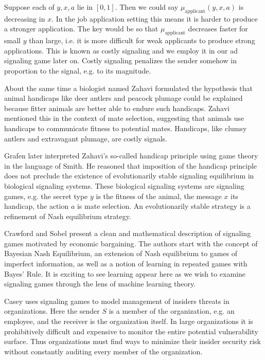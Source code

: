 \documentclass{article}
\begin{document}
Suppose each of $y, x, a$ lie in $[0,1]$. Then we could say $\mu_{\text{applicant}}(y, x, a)$ is decreasing in $x$. In the job application setting this means it is harder to produce a stronger application. The key would be so that $\mu_{\text{applicant}}$ decreases faster for small $y$ than large, i.e. it is more difficult for weak applicants to produce strong applications. This is known as costly signaling and we employ it in our ad signaling game later on. Costly signaling penalizes the sender somehow in proportion to the signal, e.g. to its magnitude.

About the same time a biologist named Zahavi \cite{zahavi1} formulated the hypothesis that animal handicaps like deer antlers and peacock plumage could be explained because fitter animals are better able to endure such handicaps. Zahavi mentioned this in the context of mate selection, suggesting that animals use handicaps to communicate fitness to potential mates. Handicaps, like clumsy antlers and extravagant plumage, are costly signals.

Grafen\cite{grafen1} later interpreted Zahavi's so-called handicap principle using game theory in the language of Smith\cite{smith1982evolution}. He reasoned that imposition of the handicap principle does not preclude the existence of evolutionarily stable signaling equilibrium in biological signaling systems. These biological signaling systems are signaling games, e.g. the secret type $y$ is the fitness of the animal, the message $x$ its handicap, the action $a$ is mate selection. An evolutionarily stable strategy is a refinement of Nash equilibrium strategy.

Crawford and Sobel\cite{crawford1982strategic} present a clean and mathematical description of signaling games motivated by economic bargaining. The authors start with the concept of Bayesian Nash Equilibrium, an extension of Nash equilibrium to games of imperfect information, as well as a notion of learning in repeated games with Bayes' Rule. It is exciting to see learning appear here as we wish to examine signaling games through the lens of machine learning theory.

Casey\cite{casey1} uses signaling games to model management of insiders threats in organizations. Here the sender $S$ is a member of the organization, e.g. an employee, and the receiver is the organization itself. In large organizations it is prohibitively difficult and expensive to monitor the entire potential vulnerability surface. Thus organizations must find ways to minimize their insider security risk without constantly auditing every member of the organization.
\end{document}
